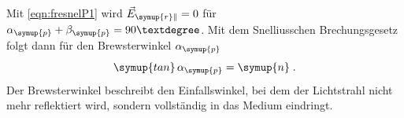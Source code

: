 Mit \autoref{eqn:fresnelP1} wird $\vec{E}_{\symup{r}\|} = 0$ für $\alpha_{\symup{p}}+\beta_{\symup{p}} = 90°$. Mit dem Snelliusschen Brechungsgesetz
folgt dann für den Brewsterwinkel $\alpha_{\symup{p}}$
\begin{equation}
    \symup{tan}\,\alpha_{\symup{p}} = \symup{n} \; . 
    \label{eqn:brewster}
\end{equation}
Der Brewsterwinkel beschreibt den Einfallswinkel, bei dem der Lichtstrahl nicht mehr reflektiert wird, sondern vollständig in das Medium eindringt.